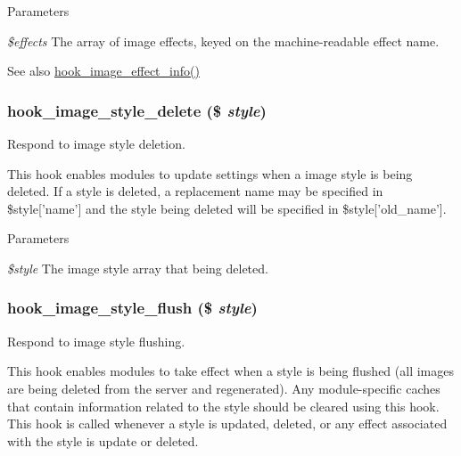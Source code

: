 \begin{DoxyParams}{Parameters}
\item[{\em \$effects}]The array of image effects, keyed on the machine-\/readable effect name.\end{DoxyParams}
\begin{DoxySeeAlso}{See also}
\hyperlink{group__hooks_ga9681816aeb01a316e98457b40a01f8ed}{hook\_\-image\_\-effect\_\-info()} 
\end{DoxySeeAlso}
\hypertarget{group__hooks_ga376a3d4a9427d6a8dad73d68bdd140dc}{
\subsubsection[{hook\_\-image\_\-style\_\-delete}]{\setlength{\rightskip}{0pt plus 5cm}hook\_\-image\_\-style\_\-delete (\$ {\em style})}}
\label{group__hooks_ga376a3d4a9427d6a8dad73d68bdd140dc}
Respond to image style deletion.

This hook enables modules to update settings when a image style is being deleted. If a style is deleted, a replacement name may be specified in \$style\mbox{[}'name'\mbox{]} and the style being deleted will be specified in \$style\mbox{[}'old\_\-name'\mbox{]}.


\begin{DoxyParams}{Parameters}
\item[{\em \$style}]The image style array that being deleted. \end{DoxyParams}
\hypertarget{group__hooks_gac3c4d53e1323d4e140625e214d3a5f02}{
\subsubsection[{hook\_\-image\_\-style\_\-flush}]{\setlength{\rightskip}{0pt plus 5cm}hook\_\-image\_\-style\_\-flush (\$ {\em style})}}
\label{group__hooks_gac3c4d53e1323d4e140625e214d3a5f02}
Respond to image style flushing.

This hook enables modules to take effect when a style is being flushed (all images are being deleted from the server and regenerated). Any module-\/specific caches that contain information related to the style should be cleared using this hook. This hook is called whenever a style is updated, deleted, or any effect associated with the style is update or deleted.


